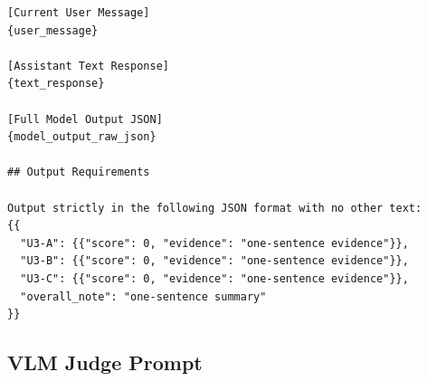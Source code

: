 \documentclass{llmxive}
\begin{document}
\begin{verbatim}
[Current User Message]
{user_message}

[Assistant Text Response]
{text_response}

[Full Model Output JSON]
{model_output_raw_json}

## Output Requirements

Output strictly in the following JSON format with no other text:
{{
  "U3-A": {{"score": 0, "evidence": "one-sentence evidence"}},
  "U3-B": {{"score": 0, "evidence": "one-sentence evidence"}},
  "U3-C": {{"score": 0, "evidence": "one-sentence evidence"}},
  "overall_note": "one-sentence summary"
}}
\end{verbatim}

\subsection{VLM Judge Prompt}
\label{app:a2ui-vlm-judge-prompt}
\end{document}
